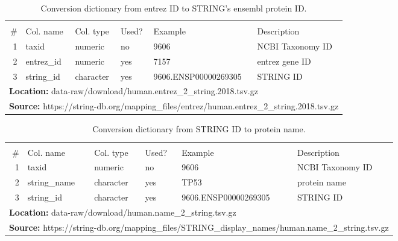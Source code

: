 \begin{table}[H]

\caption{\label{tab:link_entrez_string}Conversion dictionary from entrez ID to STRING's ensembl protein ID.}
\begin{tabular}[t]{rlllll}
\toprule
\multicolumn{6}{c}{\bgroup\fontsize{12}{14}\selectfont \cellcolor[HTML]{EEEEEE}{\ttfamily{\textbf{link\_entrez\_string}}}\egroup{}} \\
\cmidrule(l{3pt}r{3pt}){1-6}
\# & Col. name & Col. type & Used? & Example & Description\\
\midrule
\rowcolor{gray!6}  1 & taxid & numeric & no & 9606 & NCBI Taxonomy ID\\
2 & entrez\_id & numeric & yes & 7157 & entrez gene ID\\
\rowcolor{gray!6}  3 & string\_id & character & yes & 9606.ENSP00000269305 & STRING ID\\
\bottomrule
\multicolumn{6}{l}{\textbf{Location: } data-raw/download/human.entrez\_2\_string.2018.tsv.gz}\\
\multicolumn{6}{l}{\textbf{Source: } https://string-db.org/mapping\_files/entrez/human.entrez\_2\_string.2018.tsv.gz}\\
\end{tabular}
\end{table}
\begin{table}[H]

\caption{\label{tab:string_names}Conversion dictionary from STRING ID to protein name.}
\begin{tabular}[t]{rlllll}
\toprule
\multicolumn{6}{c}{\bgroup\fontsize{12}{14}\selectfont \cellcolor[HTML]{EEEEEE}{\ttfamily{\textbf{string\_names}}}\egroup{}} \\
\cmidrule(l{3pt}r{3pt}){1-6}
\# & Col. name & Col. type & Used? & Example & Description\\
\midrule
\rowcolor{gray!6}  1 & taxid & numeric & no & 9606 & NCBI Taxonomy ID\\
2 & string\_name & character & yes & TP53 & protein name\\
\rowcolor{gray!6}  3 & string\_id & character & yes & 9606.ENSP00000269305 & STRING ID\\
\bottomrule
\multicolumn{6}{l}{\textbf{Location: } data-raw/download/human.name\_2\_string.tsv.gz}\\
\multicolumn{6}{l}{\textbf{Source: } https://string-db.org/mapping\_files/STRING\_display\_names/human.name\_2\_string.tsv.gz}\\
\end{tabular}
\end{table}
